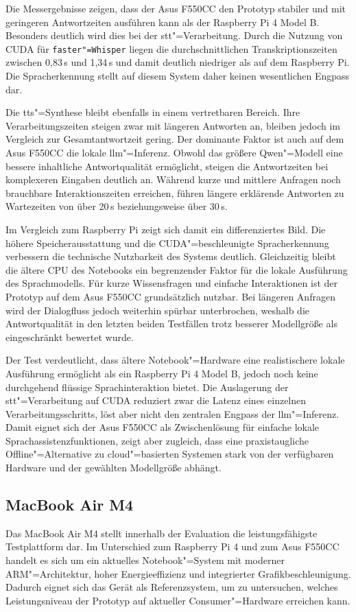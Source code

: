 Die Messergebnisse zeigen, dass der Asus F550CC den Prototyp stabiler und mit geringeren Antwortzeiten ausführen kann als der Raspberry Pi 4 Model B. Besonders deutlich wird dies bei der \gls{stt}"=Verarbeitung. Durch die Nutzung von CUDA für \texttt{faster"=Whisper} liegen die durchschnittlichen Transkriptionszeiten zwischen 0,83\,s und 1,34\,s und damit deutlich niedriger als auf dem Raspberry Pi. Die Spracherkennung stellt auf diesem System daher keinen wesentlichen Engpass dar.

Die \gls{tts}"=Synthese bleibt ebenfalls in einem vertretbaren Bereich. Ihre Verarbeitungszeiten steigen zwar mit längeren Antworten an, bleiben jedoch im Vergleich zur Gesamtantwortzeit gering. Der dominante Faktor ist auch auf dem Asus F550CC die lokale \gls{llm}"=Inferenz. Obwohl das größere Qwen"=Modell eine bessere inhaltliche Antwortqualität ermöglicht, steigen die Antwortzeiten bei komplexeren Eingaben deutlich an. Während kurze und mittlere Anfragen noch brauchbare Interaktionszeiten erreichen, führen längere erklärende Antworten zu Wartezeiten von über 20\,s beziehungsweise über 30\,s.

Im Vergleich zum Raspberry Pi zeigt sich damit ein differenziertes Bild. Die höhere Speicherausstattung und die CUDA"=beschleunigte Spracherkennung verbessern die technische Nutzbarkeit des Systems deutlich. Gleichzeitig bleibt die ältere CPU des Notebooks ein begrenzender Faktor für die lokale Ausführung des Sprachmodells. Für kurze Wissensfragen und einfache Interaktionen ist der Prototyp auf dem Asus F550CC grundsätzlich nutzbar. Bei längeren Anfragen wird der Dialogfluss jedoch weiterhin spürbar unterbrochen, weshalb die Antwortqualität in den letzten beiden Testfällen trotz besserer Modellgröße als eingeschränkt bewertet wurde.

Der Test verdeutlicht, dass ältere Notebook"=Hardware eine realistischere lokale Ausführung ermöglicht als ein Raspberry Pi 4 Model B, jedoch noch keine durchgehend flüssige Sprachinteraktion bietet. Die Auslagerung der \gls{stt}"=Verarbeitung auf CUDA reduziert zwar die Latenz eines einzelnen Verarbeitungsschritts, löst aber nicht den zentralen Engpass der \gls{llm}"=Inferenz. Damit eignet sich der Asus F550CC als Zwischenlösung für einfache lokale Sprachassistenzfunktionen, zeigt aber zugleich, dass eine praxistaugliche Offline"=Alternative zu cloud"=basierten Systemen stark von der verfügbaren Hardware und der gewählten Modellgröße abhängt.


\subsection{MacBook Air M4}
\label{subsec:MacBook_Air_M4}
Das MacBook Air M4 stellt innerhalb der Evaluation die leistungsfähigste Testplattform dar. Im Unterschied zum Raspberry Pi 4 und zum Asus F550CC handelt es sich um ein aktuelles Notebook"=System mit moderner ARM"=Architektur, hoher Energieeffizienz und integrierter Grafikbeschleunigung. Dadurch eignet sich das Gerät als Referenzsystem, um zu untersuchen, welches Leistungsniveau der Prototyp auf aktueller Consumer"=Hardware erreichen kann.

